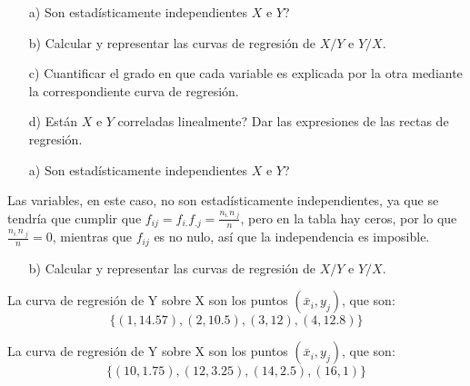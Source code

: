 \documentclass[a4paper,12pt]{article}
\begin{document}
\begin{enumerate}
    \item[a)] \textquestiondown Son estad\'isticamente independientes $X$ e $Y$?
    \item[b)] Calcular y representar las curvas de regresi\'on de $X/Y$ e $Y/X$.
    \item[c)] Cuantificar el grado en que cada variable es explicada por la otra mediante la correspondiente curva de regresi\'on.
    \item[d)] \textquestiondown Est\'an $X$ e $Y$ correladas linealmente? Dar las expresiones de las rectas de regresi\'on.
\end{enumerate}

\begin{enumerate}
    \item[a)] \textquestiondown Son estad\'isticamente independientes $X$ e $Y$?
\end{enumerate}
Las variables, en este caso, no son estadísticamente independientes, ya que se tendría que cumplir que $f_{ij}=f_{i.}f_{.j}=\frac{n_{i.}n_{.j}}{n}$, pero en la tabla hay ceros, por lo que $\frac{n_{i.}n_{.j}}{n}=0$, mientras que $f_{ij}$ es no nulo, así que la independencia es imposible.

\begin{enumerate}
    \item[b)] Calcular y representar las curvas de regresi\'on de $X/Y$ e $Y/X$.
\end{enumerate}

La curva de regresión de Y sobre X son los puntos $(\bar x_i, y_j)$, que son:
\[\{(1,14.57), (2,10.5), (3,12), (4, 12.8)\}\]

\begin{center}
\end{center}

La curva de regresión de Y sobre X son los puntos $(\bar x_i, y_j)$, que son:
\[\{(10, 1.75), (12, 3.25), (14, 2.5),(16, 1)\}\]
\end{document}
